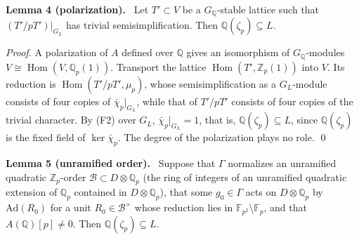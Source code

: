 \documentclass[11pt]{article}
\newenvironment{statement}[1]{\par\medskip\noindent\phantomsection\textbf{#1}\ }{\par\medskip}
\newcommand{\Q}{\mathbb Q}
\newcommand{\Z}{\mathbb Z}
\newcommand{\F}{\mathbb F}
\DeclareMathOperator{\Hom}{Hom}
\begin{document}
\begin{statement}{Lemma 4 (polarization).}\label{lemma-pol}
Let \(T'\subset V\) be a \(G_{\Q}\)-stable lattice such that \((T'/pT')|_{G_L}\) has trivial
semisimplification. Then \(\Q(\zeta_p)\subseteq L\).
\end{statement}

\emph{Proof.} A polarization of \(A\) defined over \(\Q\) gives an isomorphism of
\(G_{\Q}\)-modules \(V\cong\Hom(V,\Q_p(1))\). Transport the lattice \(\Hom(T',\Z_p(1))\) into
\(V\). Its reduction is \(\Hom(T'/pT',\mu_p)\), whose semisimplification as a \(G_L\)-module
consists of four copies of \(\bar\chi_p|_{G_L}\), while that of \(T'/pT'\) consists of four
copies of the trivial character. By (F2) over \(G_L\), \(\bar\chi_p|_{G_L}=1\), that is, \(\Q(\zeta_p)\subseteq L\), since \(\Q(\zeta_p)\) is the
fixed field of \(\ker\bar\chi_p\). The degree of the
polarization plays no role. \qed

\begin{statement}{Lemma 5 (unramified order).}\label{lemma-unram}
Suppose that \(\Gamma\) normalizes an unramified quadratic \(\Z_p\)-order
\(\mathcal B\subset D\otimes\Q_p\) (the ring of integers of an unramified quadratic extension of \(\Q_p\)
contained in \(D\otimes\Q_p\)), that some \(g_0\in\Gamma\) acts on \(D\otimes\Q_p\) by
\(\mathrm{Ad}(R_0)\) for a unit \(R_0\in\mathcal B^\times\) whose reduction lies in
\(\F_{p^2}\setminus\F_p\), and that \(A(\Q)[p]\neq0\). Then \(\Q(\zeta_p)\subseteq L\).
\end{statement}
\end{document}
